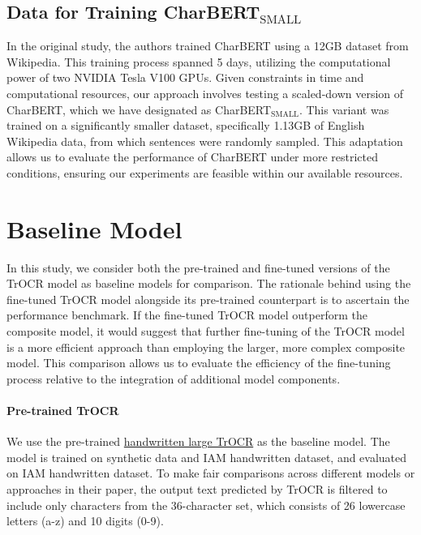 \subsection{Data for Training CharBERT$_{\text{SMALL}}$}
\label{subsec:3_data_for_training_charbert}
In the original study, the authors trained CharBERT using a 12GB dataset from Wikipedia. This training process spanned 5 days, utilizing the computational power of two NVIDIA Tesla V100 GPUs. Given constraints in time and computational resources, our approach involves testing a scaled-down version of CharBERT, which we have designated as CharBERT$_{\text{SMALL}}$. This variant was trained on a significantly smaller dataset, specifically 1.13GB of English Wikipedia data, from which sentences were randomly sampled. This adaptation allows us to evaluate the performance of CharBERT under more restricted conditions, ensuring our experiments are feasible within our available resources.
\section{Baseline Model}
\label{sec:4_baseline_model}
In this study, we consider both the pre-trained and fine-tuned versions of the TrOCR model as baseline models for comparison. The rationale behind using the fine-tuned TrOCR model alongside its pre-trained counterpart is to ascertain the performance benchmark. If the fine-tuned TrOCR model outperform the composite model, it would suggest that further fine-tuning of the TrOCR model is a more efficient approach than employing the larger, more complex composite model. This comparison allows us to evaluate the efficiency of the fine-tuning process relative to the integration of additional model components.
\paragraph*{Pre-trained TrOCR}
\label{par:4_pre-trained_trocr}
We use the pre-trained \href{https://huggingface.co/microsoft/trocr-large-handwritten}{handwritten large TrOCR} as the baseline model. The model is trained on synthetic data and IAM handwritten dataset, and evaluated on IAM handwritten dataset. To make fair comparisons across different models or approaches in their paper, the output text predicted by TrOCR is filtered to include only characters from the 36-character set, which consists of 26 lowercase letters (a-z) and 10 digits (0-9). 
